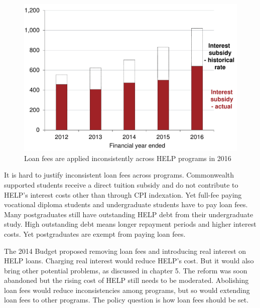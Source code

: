 \documentclass[embargoed]{grattan}
\begin{document}
\begin{figure}
\caption[Loan fees are applied inconsistently across HELP programs in 2016]{Loan fees are applied inconsistently across \gls{HELP} programs in 2016}\label{fig:fig19-loan-fees-are-applied-inconsitently-across-HELP-programs-2016}

\includegraphics[page=19]{atlas/Chartpack.pdf}

\end{figure}

It is hard to justify inconsistent loan fees across programs.
Commonwealth supported students receive a direct tuition subsidy and do not contribute to \gls{HELP}'s interest costs other than through \gls{CPI} indexation.
Yet full-fee paying vocational diploma students and undergraduate students have to pay loan fees.
Many postgraduates still have outstanding \gls{HELP} debt from their undergraduate study.
High outstanding debt means longer repayment periods and higher interest costs.
Yet postgraduates are exempt from paying loan fees.

The 2014 Budget proposed removing loan fees and introducing real interest on \gls{HELP} loans.
Charging real interest would reduce \gls{HELP}'s cost.
But it would also bring other potential problems, as discussed in chapter 5.
The reform was soon abandoned but the rising cost of \gls{HELP} still needs to be moderated.
Abolishing loan fees would reduce inconsistencies among programs, but so would extending loan fees to other programs.
The policy question is how loan fees should be set.
\end{document}
